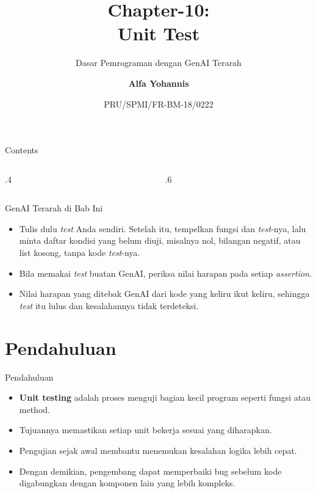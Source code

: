\documentclass[aspectratio=169, table]{beamer}
\subtitle{Dasar Pemrograman dengan GenAI Terarah}
\title{Chapter-10:\\\LARGE{Unit Test\\}
\vspace{10pt}}
\date[Serial]{\scriptsize {PRU/SPMI/FR-BM-18/0222}}
\author[Pradita]{\small{\textbf{Alfa Yohannis}}}
\begin{document}
\frame{\titlepage}

\begin{frame}[fragile]{Contents}
\vspace{15pt}
\begin{columns}[t]
\begin{column}{.4\textwidth}
\tableofcontents[sections={1-3}]
\end{column}
\begin{column}{.6\textwidth}
\tableofcontents[sections={4-8}]
\end{column}
\end{columns}
\end{frame}


\begin{frame}{GenAI Terarah di Bab Ini}
\small
\begin{itemize}
  \item Tulis dulu \textit{test} Anda sendiri. Setelah itu, tempelkan fungsi dan \textit{test}-nya, lalu minta daftar kondisi yang belum diuji, misalnya nol, bilangan negatif, atau list kosong, tanpa kode \textit{test}-nya.
  \item Bila memakai \textit{test} buatan GenAI, periksa nilai harapan pada setiap \textit{assertion}.
  \item Nilai harapan yang ditebak GenAI dari kode yang keliru ikut keliru, sehingga \textit{test} itu lulus dan kesalahannya tidak terdeteksi.
\end{itemize}
\end{frame}

\section{Pendahuluan}

\begin{frame}[fragile]{Pendahuluan}
\vspace*{15pt}
\begin{itemize}
  \item \textbf{Unit testing} adalah proses menguji bagian kecil program seperti fungsi atau method.
  \item Tujuannya memastikan setiap unit bekerja sesuai yang diharapkan.
  \item Pengujian sejak awal membantu menemukan kesalahan logika lebih cepat.
  \item Dengan demikian, pengembang dapat memperbaiki bug sebelum kode digabungkan dengan komponen lain yang lebih kompleks.
\end{itemize}
\end{frame}
\end{document}
